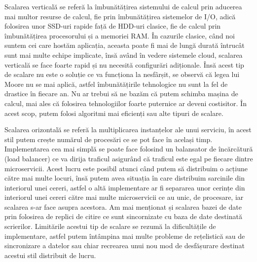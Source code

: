 Scalarea verticală se referă la îmbunătățirea sistemului de calcul
prin aducerea mai multor resurse de calcul, fie prin îmbunătățirea sistemelor de I/O,
adică folosirea unor SSD-uri rapide față de HDD-uri clasice, fie de calcul prin
îmbunătățirea procesorului și a memoriei RAM. În cazurile clasice, când noi suntem
cei care hostăm aplicația, aceasta poate fi mai de lungă durată întrucât sunt mai multe
echipe implicate, însă având în vedere sistemele cloud, scalarea verticală se face foarte rapid
și nu necesită configurări adiționale. Însă acest tip de scalare nu este o soluție ce va
funcționa la nesfârșit, se observă că legea lui Moore nu se mai aplică, astfel îmbunătățirile
tehnologice nu sunt la fel de drastice în fiecare an. Nu ar trebui să ne bazăm că putem
schimba mașina de calcul, mai ales că folosirea tehnologiilor foarte puternice ar deveni
costisitor. În acest scop, putem folosi algoritmi mai eficienți sau alte tipuri de scalare.

Scalarea orizontală se referă la multiplicarea instanțelor ale unui serviciu, în acest
stil putem crește numărul de procesări ce se pot face în același timp. Implementarea
cea mai simplă se poate face folosind un balansator de încărcătură (load balancer) ce va
dirija traficul asigurând că traficul este egal pe fiecare dintre microservicii. Acest lucru
este posibil atunci când putem să distribuim o acțiune către mai multe locuri,
însă putem avea situația în care distribuim sarcinile din interiorul unei cereri,
astfel o altă implementare ar fi separarea unor cerințe din interiorul unei cereri
către mai multe microservicii ce au unic, de procesare, iar scalarea s-ar face asupra acestora.
Am mai menționat și scalarea bazei de date prin folosirea de replici de citire ce sunt sincornizate
cu baza de date destinată scrierilor. Limitările acestui tip de scalare se rezumă la dificultățile de
implementare, astfel putem întâmpina mai multe probleme de rețelistică sau de sincronizare a datelor
sau chiar recrearea unui nou mod de desfășurare destinat acestui stil distribuit de lucru.

